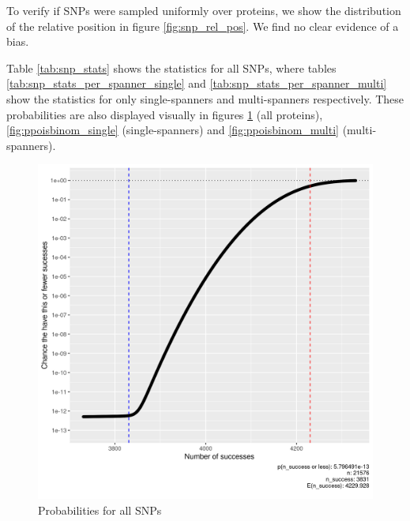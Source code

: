 
To verify if SNPs were sampled uniformly
over proteins, we show the distribution 
of the relative position in figure \ref{fig:snp_rel_pos}.
We find no clear evidence of a bias.


Table \ref{tab:snp_stats} shows the statistics for all
SNPs, where tables \ref{tab:snp_stats_per_spanner_single}
and \ref{tab:snp_stats_per_spanner_multi} show the
statistics for only single-spanners and multi-spanners respectively.
These probabilities are also displayed visually in 
figures \ref{fig:ppoisbinom} (all proteins), \ref{fig:ppoisbinom_single} (single-spanners)
and \ref{fig:ppoisbinom_multi} (multi-spanners).
 






\begin{figure}[!htbp]
  \includegraphics[width=\textwidth]{ncbi_peregrine_results/ppoisbinom.png}
  \caption{
    Probabilities for all SNPs
  }
  \label{fig:ppoisbinom}
\end{figure}

